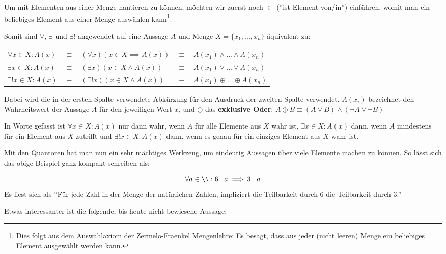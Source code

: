 Um mit Elementen aus einer Menge hantieren zu können, möchten wir zuerst noch $\in$ (''ist Element von/in'') einführen, womit man ein beliebiges Element aus einer Menge auswählen kann\footnote{Dies folgt aus dem Auswahlaxiom der Zermelo-Fraenkel Mengenlehre: Es besagt, dass aus jeder (nicht leeren) Menge ein beliebiges Element ausgewählt werden kann.}.

Somit sind $\forall$, $\exists$ und $\exists!$ angewendet auf eine Aussage $A$ und Menge $X = \{x_1, ..., x_n\}$ äquivalent zu:

\begin{center}
    \begin{tabular}{lclcl}
        $\forall x \in X : A(x)$ &$\equiv$ &$ (\forall x)(x \in X \implies A(x))$ &$\equiv$ &$ A(x_1) \land ... \land A(x_n)$\\
        $\exists x \in X : A(x)$ &$\equiv$ &$ (\exists x)(x \in X \land A(x))$ &$\equiv$ &$ A(x_1) \lor ... \lor A(x_n)$\\
        $\exists! x \in X : A(x)$&$\equiv$ &$ (\exists! x)(x \in X \land A(x)) $&$\equiv$ &$ A(x_1) \oplus ... \oplus A(x_n)$
    \end{tabular}
\end{center}


Dabei wird die in der ersten Spalte verwendete Abkürzung für den Ausdruck der zweiten Spalte verwendet. $A(x_i)$ bezeichnet den Wahrheitswert der Aussage  $A$ für den jeweiligen Wert $x_i$ und $\oplus$ das \textbf{exklusive Oder}: $A \oplus B \equiv (A \lor B) \land (\neg A \lor \neg B)$

In Worte gefasst ist $\forall x \in X : A(x)$ nur dann wahr, wenn $A$ für alle Elemente aus $X$ wahr ist, $\exists x \in X : A(x)$ dann, wenn $A$ mindestens für ein Element aus $X$ zutrifft und $\exists! x \in X : A(x)$ dann, wenn es genau für ein einziges Element aus $X$ wahr ist.

Mit den Quantoren hat man nun ein sehr mächtiges Werkzeug, um eindeutig Aussagen über viele Elemente machen zu können. So lässt sich das obige Beispiel ganz kompakt schreiben als:

\begin{example}[Fortsetzung]
$$\forall a \in \N: 6 \mid a \implies 3 \mid a$$
Es liest sich als ''Für jede Zahl in der Menge der natürlichen Zahlen, impliziert die Teilbarkeit durch 6 die Teilbarkeit durch 3.''
\end{example}

Etwas interessanter ist die folgende, bis heute nicht bewiesene Aussage:

